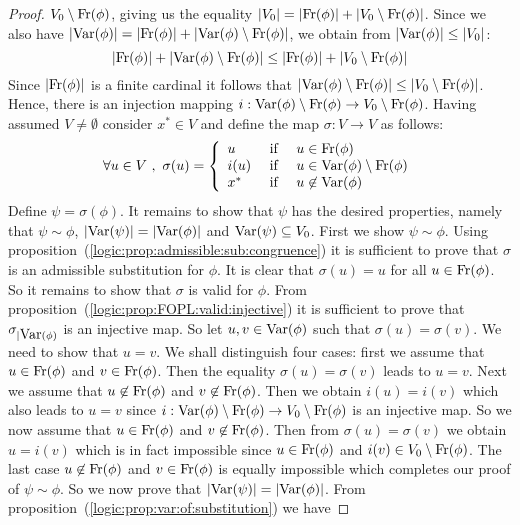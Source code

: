 \begin{proof}
$V_{0}\setminus\mbox{\rm Fr}(\phi)$, giving us the equality $|V_{0}|
=|\mbox{\rm Fr}(\phi)|+|V_{0}\setminus\mbox{\rm Fr}(\phi)|$. Since we also have
$|\mbox{\rm Var}(\phi)|=|\mbox{\rm Fr}(\phi)|+|\mbox{\rm Var}(\phi)\setminus\mbox{\rm Fr}(\phi)|$, we
obtain from $|\mbox{\rm Var}(\phi)|\leq|V_{0}|$:
    \[
    |\mbox{\rm Fr}(\phi)|+|\mbox{\rm Var}(\phi)\setminus\mbox{\rm Fr}(\phi)|\leq|\mbox{\rm Fr}(\phi)|
    +|V_{0}\setminus\mbox{\rm Fr}(\phi)|
    \]
Since $|\mbox{\rm Fr}(\phi)|$ is a finite cardinal it follows that
$|\mbox{\rm Var}(\phi)\setminus\mbox{\rm Fr}(\phi)|\leq|V_{0}\setminus\mbox{\rm Fr}(\phi)|$.
Hence, there is an injection mapping
$i:\mbox{\rm Var}(\phi)\setminus\mbox{\rm Fr}(\phi)\to V_{0}\setminus\mbox{\rm Fr}(\phi)$.
Having assumed $V\neq\emptyset$ consider $x^{*}\in V$ and define the
map $\sigma:V\to V$ as follows:
    \[
    \forall u\in V\ ,\ \sigma(u)=\left\{
        \begin{array}{lcl}
        u&\mbox{\ if\ }&u\in\free(\phi)\\
        i(u)&\mbox{\ if\ }&u\in\var(\phi)\setminus\free(\phi)\\
        x^{*}&\mbox{\ if\ }&u\not\in\var(\phi)
        \end{array}
    \right.
    \]
Define $\psi=\sigma(\phi)$. It remains to show that $\psi$ has the
desired properties, namely that $\psi\sim\phi$,
$|\mbox{\rm Var}(\psi)|=|\mbox{\rm Var}(\phi)|$ and $\mbox{\rm Var}(\psi)\subseteq V_{0}$. First
we show $\psi\sim\phi$. Using
proposition~(\ref{logic:prop:admissible:sub:congruence}) it is
sufficient to prove that $\sigma$ is an admissible substitution for
$\phi$. It is clear that $\sigma(u)=u$ for all $u\in\mbox{\rm Fr}(\phi)$. So
it remains to show that $\sigma$ is valid for $\phi$. From
proposition~(\ref{logic:prop:FOPL:valid:injective}) it is sufficient
to prove that $\sigma_{|\mbox{\rm Var}(\phi)}$ is an injective map. So let
$u,v\in\mbox{\rm Var}(\phi)$ such that $\sigma(u)=\sigma(v)$. We need to show
that $u=v$. We shall distinguish four cases: first we assume that
$u\in\mbox{\rm Fr}(\phi)$ and $v\in\mbox{\rm Fr}(\phi)$. Then the equality
$\sigma(u)=\sigma(v)$ leads to $u=v$. Next we assume that
$u\not\in\mbox{\rm Fr}(\phi)$ and $v\not\in\mbox{\rm Fr}(\phi)$. Then we obtain
$i(u)=i(v)$ which also leads to $u=v$ since
$i:\mbox{\rm Var}(\phi)\setminus\mbox{\rm Fr}(\phi)\to V_{0}\setminus\mbox{\rm Fr}(\phi)$ is
an injective map. So we now assume that $u\in\mbox{\rm Fr}(\phi)$ and
$v\not\in\mbox{\rm Fr}(\phi)$. Then from $\sigma(u)=\sigma(v)$ we obtain
$u=i(v)$ which is in fact impossible since $u\in\mbox{\rm Fr}(\phi)$ and
$i(v)\in V_{0}\setminus\mbox{\rm Fr}(\phi)$. The last case
$u\not\in\mbox{\rm Fr}(\phi)$ and $v\in\mbox{\rm Fr}(\phi)$ is equally impossible
which completes our proof of $\psi\sim\phi$. So we now prove that
$|\mbox{\rm Var}(\psi)|=|\mbox{\rm Var}(\phi)|$. From
proposition~(\ref{logic:prop:var:of:substitution}) we have

\end{proof}
